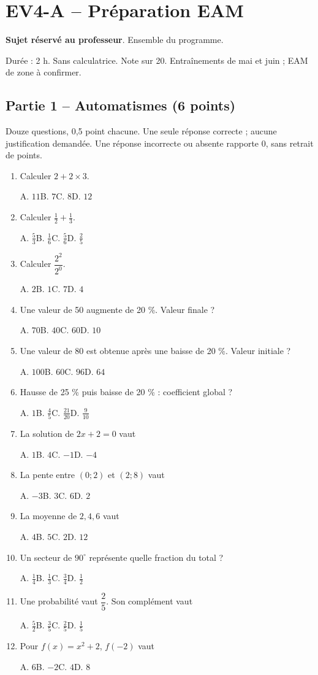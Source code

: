 \clearpage\section*{EV4-A -- Préparation EAM}\label{EV4-A}
\textbf{Sujet réservé au professeur}. Ensemble du programme.\par Durée : 2 h. Sans calculatrice. Note sur 20. Entraînements de mai et juin ; EAM de zone à confirmer.
\subsection*{Partie 1 -- Automatismes (6 points)}
Douze questions, 0,5 point chacune. Une seule réponse correcte ; aucune justification demandée. Une réponse incorrecte ou absente rapporte 0, sans retrait de points.
\begin{enumerate}
\item Calculer $2+2\times3$.\par A. $11$\quad B. $7$\quad C. $8$\quad D. $12$
\item Calculer $\frac12+\frac13$.\par A. $\frac{5}{3}$\quad B. $\frac{1}{6}$\quad C. $\frac{5}{6}$\quad D. $\frac{2}{5}$
\item Calculer $\dfrac{2^2}{2^{0}}$.\par A. $2$\quad B. $1$\quad C. $7$\quad D. $4$
\item Une valeur de 50 augmente de 20 \%. Valeur finale ?\par A. $70$\quad B. $40$\quad C. $60$\quad D. $10$
\item Une valeur de 80 est obtenue après une baisse de 20 \%. Valeur initiale ?\par A. $100$\quad B. $60$\quad C. $96$\quad D. $64$
\item Hausse de 25 \% puis baisse de 20 \% : coefficient global ?\par A. $1$\quad B. $\frac{4}{5}$\quad C. $\frac{21}{20}$\quad D. $\frac{9}{10}$
\item La solution de $2x+2=0$ vaut\par A. $1$\quad B. $4$\quad C. $-1$\quad D. $-4$
\item La pente entre $(0;2)$ et $(2;8)$ vaut\par A. $-3$\quad B. $3$\quad C. $6$\quad D. $2$
\item La moyenne de $2, 4, 6$ vaut\par A. $4$\quad B. $5$\quad C. $2$\quad D. $12$
\item Un secteur de $90^\circ$ représente quelle fraction du total ?\par A. $\frac{1}{4}$\quad B. $\frac{1}{3}$\quad C. $\frac{3}{4}$\quad D. $\frac{1}{2}$
\item Une probabilité vaut $\dfrac{2}{5}$. Son complément vaut\par A. $\frac{5}{2}$\quad B. $\frac{3}{5}$\quad C. $\frac{2}{5}$\quad D. $\frac{1}{5}$
\item Pour $f(x)=x^2+2$, $f(-2)$ vaut\par A. $6$\quad B. $-2$\quad C. $4$\quad D. $8$
\end{enumerate}
